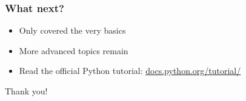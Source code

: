 \documentclass[14pt,compress]{beamer}
\begin{document}
\begin{frame}
  \frametitle{What next?}
  \begin{itemize}
  \item Only covered the very basics
  \item More advanced topics remain
  \item Read the official Python tutorial:
    \url{docs.python.org/tutorial/}
  \end{itemize}
\end{frame}


\begin{frame}
  \centering
  \Huge

  Thank you!
\end{frame}
\end{document}
